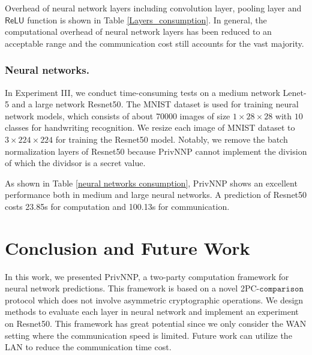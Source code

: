\documentclass[letterpaper]{article} %
\begin{document}
    Overhead of neural network layers including
    convolution layer, pooling layer and $\mathsf{ReLU}$ function is
    shown in Table \ref{Layers_consumption}.
    In general, the computational overhead of neural network layers has been reduced to an acceptable range
    and the communication cost still accounts for the vast majority.


    \subsubsection{Neural networks.}
    In Experiment III, we conduct
    time-consuming tests on a medium network Lenet-5 \cite{Lenet5} and a large network Resnet50\cite{DeepResidualLearning}.
    The MNIST dataset \cite{MNIST} is used for training neural network models, which consists of about 70000 images of size $1\times 28 \times 28$ with $10$ classes
    for handwriting recognition.
    We resize each image of MNIST dataset to $3\times 224 \times 224$ for training the Resnet50 model.
    Notably, we remove the batch normalization layers of Resnet50 because PrivNNP
    cannot implement the division of which the dividsor is a secret value.

    \begin{table}[!ht]
        \center
        \caption{Neural networks consumption}
        \label{neural networks consumption}
    \end{table}
    As shown in Table \ref{neural networks consumption}, PrivNNP shows an excellent performance
    both in medium and large neural networks.
    A prediction of Resnet50 costs 23.85s for computation and 100.13s for communication.

    \section{Conclusion and Future Work}
    In this work, we presented PrivNNP, a two-party computation framework for neural network predictions.
    This framework is based on a novel 2PC-$\mathtt{comparison}$ protocol which does not involve asymmetric cryptographic operations.
    We design methods to evaluate each layer in neural network and implement an experiment on Resnet50.
    This framework has great potential
    since we only consider the WAN setting where the communication speed is limited.
    Future work can utilize the LAN to reduce the communication time cost.

\end{document}
